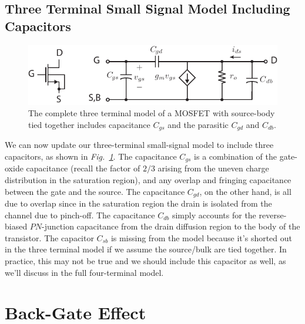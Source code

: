 \subsection{Three Terminal Small Signal Model Including Capacitors}
\begin{figure}[tb]
\centering
\includegraphics[scale=1]{mos3term_ac}
\caption{The complete three terminal model of a MOSFET with source-body tied together includes  capacitance $C_{gs}$ and the parasitic $C_{gd}$ and $C_{db}$.}
\label{fig:mos3term_ac}
\end{figure}
We can now update our three-terminal small-signal model to include three capacitors, as shown in \emph{Fig.~\ref{fig:mos3term_ac}}.  The capacitance $C_{gs}$ is a combination of the gate-oxide capacitance (recall the factor of $2/3$ arising from the uneven charge distribution in the saturation region), and any overlap and fringing capacitance between the gate and the source.  The capacitance $C_{gd}$, on the other hand, is all due to overlap since in the saturation region the drain is isolated from the channel due to pinch-off.  The capacitance $C_{db}$ simply accounts for the reverse-biased $PN$-junction capacitance from the drain diffusion region to the body of the transistor.  The capacitor $C_{sb}$ is missing from the model because it's shorted out in the three terminal model if we assume the source/bulk are tied together.  In practice, this may not be true and we should include this capacitor as well, as we'll discuss in the full four-terminal model.  
\section{Back-Gate Effect}
